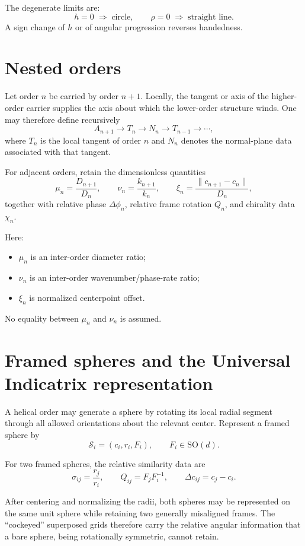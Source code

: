 \documentclass[11pt]{article}
\newcommand{\SO}{\mathrm{SO}}
\begin{document}
The degenerate limits are:
\[
h=0 \;\Rightarrow\; \text{circle},
\qquad
\rho=0 \;\Rightarrow\; \text{straight line}.
\]
A sign change of $h$ or of angular progression reverses handedness.

\section{Nested orders}

Let order $n$ be carried by order $n+1$.  Locally, the tangent or axis of the
higher-order carrier supplies the axis about which the lower-order structure
winds.  One may therefore define recursively
\[
A_{n+1}
\longrightarrow
T_n
\longrightarrow
N_n
\longrightarrow
T_{n-1}
\longrightarrow\cdots,
\]
where $T_n$ is the local tangent of order $n$ and $N_n$ denotes the normal-plane
data associated with that tangent.

For adjacent orders, retain the dimensionless quantities
\[
\mu_n=\frac{D_{n+1}}{D_n},
\qquad
\nu_n=\frac{k_{n+1}}{k_n},
\qquad
\xi_n=\frac{\|c_{n+1}-c_n\|}{D_n},
\]
together with relative phase $\Delta\phi_n$, relative frame rotation $Q_n$, and
chirality data $\chi_n$.

Here:
\begin{itemize}
    \item $\mu_n$ is an inter-order diameter ratio;
    \item $\nu_n$ is an inter-order wavenumber/phase-rate ratio;
    \item $\xi_n$ is normalized centerpoint offset.
\end{itemize}

No equality between $\mu_n$ and $\nu_n$ is assumed.

\section{Framed spheres and the Universal Indicatrix representation}

A helical order may generate a sphere by rotating its local radial segment
through all allowed orientations about the relevant center.  Represent a framed
sphere by
\[
\mathcal S_i=(c_i,r_i,F_i),
\qquad
F_i\in\SO(d).
\]

For two framed spheres, the relative similarity data are
\[
\sigma_{ij}=\frac{r_j}{r_i},
\qquad
Q_{ij}=F_jF_i^{-1},
\qquad
\Delta c_{ij}=c_j-c_i.
\]

After centering and normalizing the radii, both spheres may be represented on the
same unit sphere while retaining two generally misaligned frames.  The
``cockeyed'' superposed grids therefore carry the relative angular information
that a bare sphere, being rotationally symmetric, cannot retain.
\end{document}
